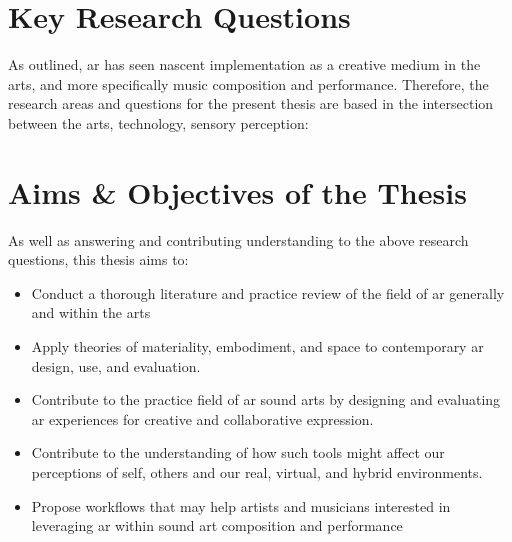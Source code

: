 \section{Key Research Questions}\label{sec: introduction-researchquestions}
As outlined, \gls{ar} has seen nascent implementation as a creative medium in the arts, and more specifically music composition and performance. Therefore, the research areas and questions for the present thesis are based in the intersection between the arts, technology, sensory perception:

\RQall

\section{Aims \& Objectives of the Thesis}\label{sec: introduction-aims}
As well as answering and contributing understanding to the above research questions, this thesis aims to:

\begin{itemize}
    \item Conduct a thorough literature and practice review of the field of \gls{ar} generally and within the arts
    \item Apply theories of materiality, embodiment, and space to contemporary \gls{ar} design, use, and evaluation.
    \item Contribute to the practice field of \gls{ar} sound arts by designing and evaluating \gls{ar} experiences for creative and collaborative expression.
    \item Contribute to the understanding of how such tools might affect our perceptions of self, others and our real, virtual, and hybrid environments. 
    \item Propose workflows that may help artists and musicians interested in leveraging \gls{ar} within sound art composition and performance
\end{itemize}



